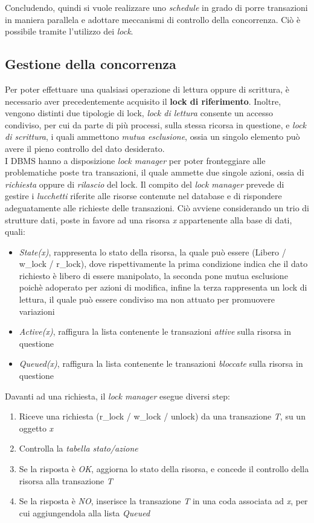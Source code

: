 \documentclass{article}
\begin{document}
Concludendo, quindi si vuole realizzare uno \textit{schedule} in grado di porre transazioni in maniera parallela e adottare meccanismi di controllo della concorrenza. Ciò è possibile tramite l'utilizzo dei \textit{lock}.

\subsection*{Gestione della concorrenza}
\large
Per poter effettuare una qualsiasi operazione di lettura oppure di scrittura, è necessario aver precedentemente acquisito il \textbf{lock di riferimento}. Inoltre, vengono distinti due tipologie di lock, \textit{lock di lettura} consente un accesso condiviso, per cui da parte di più processi, sulla stessa ricorsa in questione, e \textit{lock di scrittura}, i quali ammettono \textit{mutua esclusione}, ossia un singolo elemento può avere il pieno controllo del dato desiderato.\vspace*{14pt}\\
I DBMS hanno a disposizione \textit{lock manager} per poter fronteggiare alle problematiche poste tra transazioni, il quale ammette due singole azioni, ossia di \textit{richiesta} oppure di \textit{rilascio} del lock. Il compito del \textit{lock manager} prevede di gestire i \textit{lucchetti} riferite alle risorse contenute nel database e di rispondere adeguatamente alle richieste delle transazioni. Ciò avviene considerando un trio di strutture dati, poste in favore ad una risorsa \textit{x} appartenente alla base di dati, quali:
\begin{itemize}[label={-}]
    \itemsep0em
    \item \textit{State(x)}, rappresenta lo stato della risorsa, la quale può essere (Libero / w\_lock / r\_lock), dove rispettivamente la prima condizione indica che il dato richiesto è libero di essere manipolato, la seconda pone mutua esclusione poichè adoperato per azioni di modifica, infine la terza rappresenta un lock di lettura, il quale può essere condiviso ma non attuato per promuovere variazioni
    \item \textit{Active(x)}, raffigura la lista contenente le transazioni \textit{attive} sulla risorsa in questione
    \item \textit{Queued(x)}, raffigura la lista contenente le transazioni \textit{bloccate} sulla risorsa in questione
\end{itemize}
Davanti ad una richiesta, il \textit{lock manager} esegue diversi step:
\begin{enumerate}[label={-}]
    \itemsep0em
    \item Riceve una richiesta (r\_lock / w\_lock / unlock) da una transazione \textit{T}, su un oggetto \textit{x}
    \item Controlla la \textit{tabella stato/azione}
    \item Se la risposta è \textit{OK}, aggiorna lo stato della risorsa, e concede il controllo della risorsa alla transazione \textit{T}
    \item Se la risposta è \textit{NO}, inserisce la transazione \textit{T} in una coda associata ad \textit{x}, per cui aggiungendola alla lista \textit{Queued}
\end{enumerate}
\end{document}

